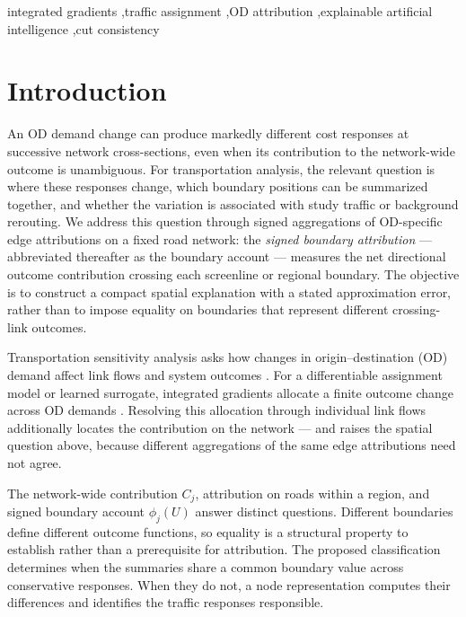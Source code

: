 \documentclass[a4paper,fleqn]{cas-sc}
\begin{document}
\begin{keywords}
integrated gradients \sep traffic assignment \sep OD attribution \sep explainable artificial intelligence \sep cut consistency
\end{keywords}
\maketitle
{}
\section{Introduction}\label{sec:intro}
An OD demand change can produce markedly different cost responses at
successive network cross-sections, even when its contribution to the
network-wide outcome is unambiguous. For transportation analysis, the
relevant question is where these responses change, which boundary
positions can be summarized together, and whether the variation is
associated with study traffic or background rerouting. We address this
question through signed aggregations of OD-specific edge attributions
on a fixed road network: the \emph{signed boundary attribution} ---
abbreviated thereafter as the boundary account --- measures the net
directional outcome contribution crossing each screenline or regional
boundary. The objective is to construct a compact spatial explanation
with a stated approximation error, rather than to impose equality on
boundaries that represent different crossing-link outcomes.

Transportation sensitivity analysis asks how changes in origin--destination
(OD) demand affect link flows and system outcomes
\citep{tobin1988sensitivity,josefsson2007sensitivity,patriksson2003aggregated}.
For a differentiable assignment model or learned surrogate, integrated
gradients allocate a finite outcome change across OD demands
\citep{sundararajan2017axiomatic}. Resolving this allocation through
individual link flows additionally locates the contribution on the
network --- and raises the spatial question above, because different
aggregations of the same edge attributions need not agree.

The network-wide contribution $C_j$, attribution on roads within a region,
and signed boundary account $\phi_j(U)$ answer distinct questions.
Different boundaries define different outcome functions, so equality is a
structural property to establish rather than a prerequisite for attribution.
The proposed classification determines when the summaries share a common
boundary value across conservative responses. When they do not, a node
representation computes their differences and identifies the traffic
responses responsible.
\end{document}
